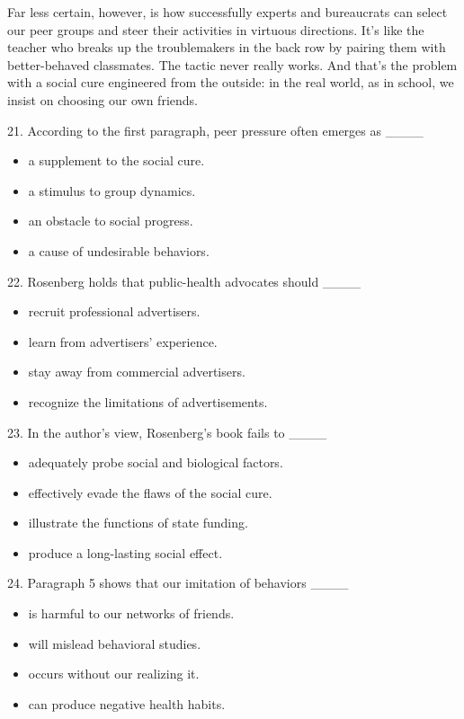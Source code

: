 \documentclass[UTF8,11pt]{ctexart}
\begin{document}
Far less certain, however, is how successfully experts and bureaucrats can select our peer groups and steer their activities in virtuous directions. It’s like the teacher who breaks up the troublemakers in the back row by pairing them with better-behaved classmates. The tactic never really works. And that’s the problem with a social cure engineered from the outside: in the real world, as in school, we insist on choosing our own friends.


21. According to the first paragraph, peer pressure often emerges as \_\_\_\_


\begin{itemize}[leftmargin=2em,itemsep=.2em,topsep=.4em]\item[A.] a supplement to the social cure.
\item[B.] a stimulus to group dynamics.
\item[C.] an obstacle to social progress.
\item[D.] a cause of undesirable behaviors.
\end{itemize}

22. Rosenberg holds that public-health advocates should \_\_\_\_


\begin{itemize}[leftmargin=2em,itemsep=.2em,topsep=.4em]\item[A.] recruit professional advertisers.
\item[B.] learn from advertisers’ experience.
\item[C.] stay away from commercial advertisers.
\item[D.] recognize the limitations of advertisements.
\end{itemize}

23. In the author’s view, Rosenberg’s book fails to \_\_\_\_


\begin{itemize}[leftmargin=2em,itemsep=.2em,topsep=.4em]\item[A.] adequately probe social and biological factors.
\item[B.] effectively evade the flaws of the social cure.
\item[C.] illustrate the functions of state funding.
\item[D.] produce a long-lasting social effect.
\end{itemize}

24. Paragraph 5 shows that our imitation of behaviors \_\_\_\_


\begin{itemize}[leftmargin=2em,itemsep=.2em,topsep=.4em]\item[A.] is harmful to our networks of friends.
\item[B.] will mislead behavioral studies.
\item[C.] occurs without our realizing it.
\item[D.] can produce negative health habits.
\end{itemize}
\end{document}

